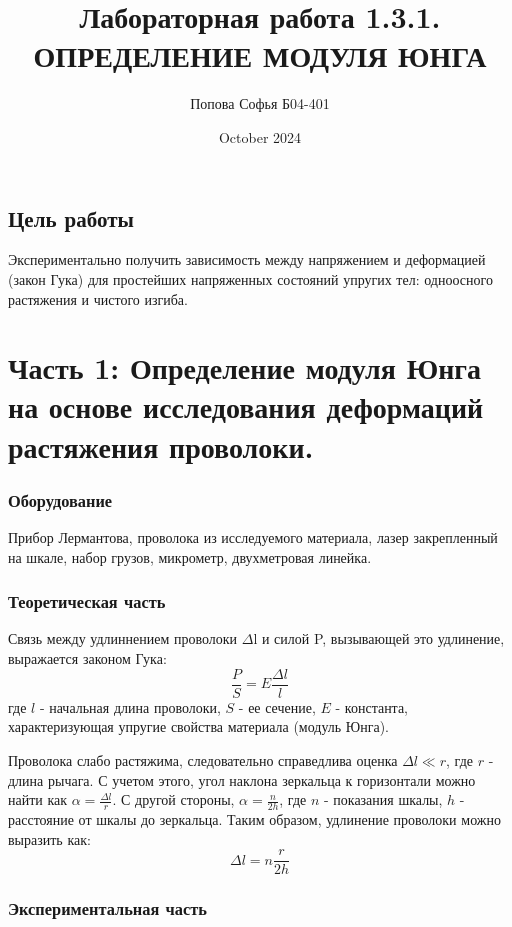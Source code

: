 \documentclass{article}
\title{\textbf{Лабораторная работа 1.3.1.} \linebreak
ОПРЕДЕЛЕНИЕ МОДУЛЯ ЮНГА}
\author{Попова Софья Б04-401}
\date{October 2024}
\begin{document}
\maketitle

\subsection*{Цель работы}
Экспериментально получить зависимость между напряжением и деформацией (закон Гука) для простейших напряженных состояний упругих тел: одноосного растяжения и чистого изгиба.


\section*{Часть 1: Определение модуля Юнга на основе исследования деформаций растяжения проволоки.}

\subsubsection*{Оборудование}
Прибор Лермантова, проволока из исследуемого материала, лазер закрепленный на шкале, набор грузов, микрометр, двухметровая линейка.


\subsubsection*{Теоретическая часть}

\noindent
Связь между удлиннением проволоки $\Delta$l и силой P, вызывающей это удлинение, выражается законом Гука: 
\begin{equation}\label{нср}
\frac{P}{S}=E\frac{\Delta l}{l}
\end{equation}
где $l$ - начальная длина проволоки, $S$ - ее сечение, $E$ - константа, характеризующая упругие свойства материала (модуль Юнга).

\noindent
Проволока слабо растяжима, следовательно справедлива оценка $\Delta l \ll r$, где $r$ - длина рычага. С учетом этого, угол наклона зеркальца к горизонтали можно найти как $\alpha = \frac{\Delta l}{r}$. С другой стороны, $\alpha = \frac{n}{2h}$, где $n$ - показания шкалы, $h$ - расстояние от шкалы до зеркальца. Таким образом, удлинение проволоки можно выразить как: 
\begin{equation}\label{нср}
\Delta l = n\frac{r}{2h}
\end{equation}


\subsubsection*{Экспериментальная часть}
\end{document}
